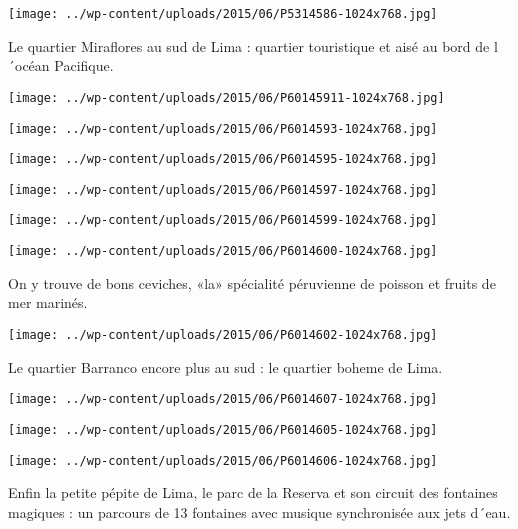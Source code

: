  \newline
\centerline{\texttt{[image: ../wp-content/uploads/2015/06/P5314586-1024x768.jpg]} } 
 \newline
 Le quartier Miraflores au sud de Lima : quartier touristique et aisé au bord de l´océan Pacifique. \newline
 \newline
\centerline{\texttt{[image: ../wp-content/uploads/2015/06/P60145911-1024x768.jpg]} } 
 \newline
 \newline
\centerline{\texttt{[image: ../wp-content/uploads/2015/06/P6014593-1024x768.jpg]} } 
 \newline
 \newline
\centerline{\texttt{[image: ../wp-content/uploads/2015/06/P6014595-1024x768.jpg]} } 
 \newline
 \newline
\centerline{\texttt{[image: ../wp-content/uploads/2015/06/P6014597-1024x768.jpg]} } 
 \newline
 \newline
\centerline{\texttt{[image: ../wp-content/uploads/2015/06/P6014599-1024x768.jpg]} } 
 \newline
 \newline
\centerline{\texttt{[image: ../wp-content/uploads/2015/06/P6014600-1024x768.jpg]} } 
 \newline
 On y trouve de bons ceviches, «la» spécialité péruvienne de poisson et fruits de mer marinés. \newline
 \newline
\centerline{\texttt{[image: ../wp-content/uploads/2015/06/P6014602-1024x768.jpg]} } 
 \newline
 Le quartier Barranco encore plus au sud : le quartier boheme de Lima. \newline
 \newline
\centerline{\texttt{[image: ../wp-content/uploads/2015/06/P6014607-1024x768.jpg]} } 
 \newline
 \newline
\centerline{\texttt{[image: ../wp-content/uploads/2015/06/P6014605-1024x768.jpg]} } 
 \newline
 \newline
\centerline{\texttt{[image: ../wp-content/uploads/2015/06/P6014606-1024x768.jpg]} } 
 \newline
 Enfin la petite pépite de Lima, le parc de la Reserva et son circuit des fontaines magiques : un parcours de 13 fontaines avec musique synchronisée aux jets d´eau. \newline

